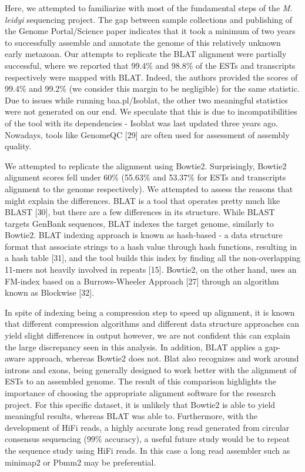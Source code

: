 \documentclass[
]{article}
\begin{document}
Here, we attempted to familiarize with most of the fundamental steps of
the \emph{M. leidyi} sequencing project. The gap between sample
collections and publishing of the Genome Portal/Science paper indicates
that it took a minimum of two years to successfully assemble and
annotate the genome of this relatively unknown early metazoan. Our
attempts to replicate the BLAT alignment were partially successful,
where we reported that 99.4\% and 98.8\% of the ESTs and transcripts
respectively were mapped with BLAT. Indeed, the authors provided the
scores of 99.4\% and 99.2\% (we consider this margin to be negligible)
for the same statistic. Due to issues while running baa.pl/Isoblat, the
other two meaningful statistics were not generated on our end. We
speculate that this is due to incompatibilities of the tool with its
dependencies - Isoblat was last updated three years ago. Nowadays, tools
like GenomeQC {[}29{]} are often used for assessment of assembly
quality.

We attempted to replicate the alignment using Bowtie2. Surprisingly,
Bowtie2 alignment scores fell under 60\% (55.63\% and 53.37\% for ESTs
and transcripts alignment to the genome respectively). We attempted to
assess the reasons that might explain the differences. BLAT is a tool
that operates pretty much like BLAST {[}30{]}, but there are a few
differences in its structure. While BLAST targets GenBank sequences,
BLAT indexes the target genome, similarly to Bowtie2. BLAT indexing
approach is known as hash-based - a data structure format that associate
strings to a hash value through hash functions, resulting in a hash
table {[}31{]}, and the tool builds this index by finding all the
non-overlapping 11-mers not heavily involved in repeats {[}15{]}.
Bowtie2, on the other hand, uses an FM-index based on a Burrows-Wheeler
Approach {[}27{]} through an algorithm known as Blockwise {[}32{]}.

In spite of indexing being a compression step to speed up alignment, it
is known that different compression algorithms and different data
structure approaches can yield slight differences in output however, we
are not confident this can explain the large discrepancy seen in this
analysis. In addition, BLAT applies a gap-aware approach, whereas
Bowtie2 does not. Blat also recognizes and work around introns and
exons, being generally designed to work better with the alignment of
ESTs to an assembled genome. The result of this comparison highlights
the importance of choosing the appropriate alignment software for the
research project. For this specific dataset, it is unlikely that Bowtie2
is able to yield meaningful results, whereas BLAT was able to.
Furthermore, with the development of HiFi reads, a highly accurate long
read generated from circular consensus sequencing (99\% accuracy), a
useful future study would be to repeat the sequence study using HiFi
reads. In this case a long read assembler such as minimap2 or Pbmm2 may
be preferential.
\end{document}
